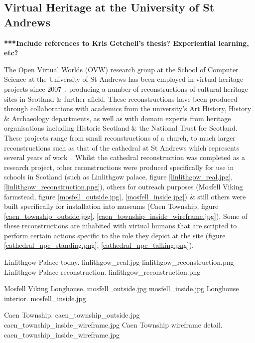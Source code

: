 
\subsection{Virtual Heritage at the University of St Andrews}

\label{virtual-heritage-at-st-andrews}

\textbf{***Include references to Kris Getchell's thesis? Experiential learning, etc?}

The Open Virtual Worlds (OVW) research group at the School of Computer Science at the University of St Andrews has been employed in virtual heritage projects since 2007~\cite{Getchell2007}, producing a number of reconstructions of cultural heritage sites in Scotland \& further afield. These reconstructions have been produced through collaborations with academics from the university's Art History, History \& Archaeology departments, as well as with domain experts from heritage organisations including Historic Scotland \& the National Trust for Scotland. These projects range from small reconstructions of a church, to much larger reconstructions such as that of the cathedral at St Andrews which represents several years of work~\cite{Kennedy2013}. Whilst the cathedral reconstruction was completed as a research project, other reconstructions were produced specifically for use in schools in Scotland (such as Linlithgow palace, figure \ref{linlithgow_real.jpg}, \ref{linlithgow_reconstruction.png}), others for outreach purposes (Mosfell Viking farmstead, figure \ref{mosfell_outside.jpg}, \ref{mosfell_inside.jpg}) \& still others were built specifically for installation into museums (Caen Township, figure \ref{caen_township_outside.jpg}, \ref{caen_township_inside_wireframe.jpg}). Some of these reconstructions are inhabited with virtual humans that are scripted to perform certain actions specific to the role they depict at the site (figure \ref{cathedral_npc_standing.png}, \ref{cathedral_npc_talking.png}).

 {Linlithgow Palace today.} {linlithgow_real.jpg}
       {linlithgow_reconstruction.png} {Linlithgow Palace reconstruction.} {linlithgow_reconstruction.png}

 {Mosfell Viking Longhouse.} {mosfell_outside.jpg}
	   {mosfell_inside.jpg} {Longhouse interior.} {mosfell_inside.jpg}

 {Caen Township.} {caen_township_outside.jpg}
       {caen_township_inside_wireframe.jpg} {Caen Township wireframe detail.} {caen_township_inside_wireframe.jpg}


